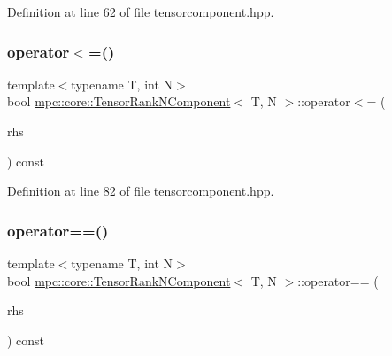 Definition at line 62 of file tensorcomponent.\+hpp.

\mbox{\label{classmpc_1_1core_1_1_tensor_rank_n_component_a82c62e2f448445e13931a1b64217f582}} 
\subsubsection{\texorpdfstring{operator$<$=()}{operator<=()}}
{\footnotesize\ttfamily template$<$typename T, int N$>$ \\
bool \mbox{\hyperlink{classmpc_1_1core_1_1_tensor_rank_n_component}{mpc\+::core\+::\+Tensor\+Rank\+N\+Component}}$<$ T, N $>$\+::operator$<$= (\begin{DoxyParamCaption}\item[{const \mbox{\hyperlink{classmpc_1_1core_1_1_tensor_rank_n_component}{Tensor\+Rank\+N\+Component}}$<$ T, N $>$ \&}]{rhs }\end{DoxyParamCaption}) const\hspace{0.3cm}{\ttfamily [inline]}}



Definition at line 82 of file tensorcomponent.\+hpp.

\mbox{\label{classmpc_1_1core_1_1_tensor_rank_n_component_af4daf80199bb73541c8ccee2f41e45e6}} 
\subsubsection{\texorpdfstring{operator==()}{operator==()}}
{\footnotesize\ttfamily template$<$typename T, int N$>$ \\
bool \mbox{\hyperlink{classmpc_1_1core_1_1_tensor_rank_n_component}{mpc\+::core\+::\+Tensor\+Rank\+N\+Component}}$<$ T, N $>$\+::operator== (\begin{DoxyParamCaption}\item[{const \mbox{\hyperlink{classmpc_1_1core_1_1_tensor_rank_n_component}{Tensor\+Rank\+N\+Component}}$<$ T, N $>$ \&}]{rhs }\end{DoxyParamCaption}) const\hspace{0.3cm}{\ttfamily [inline]}}




